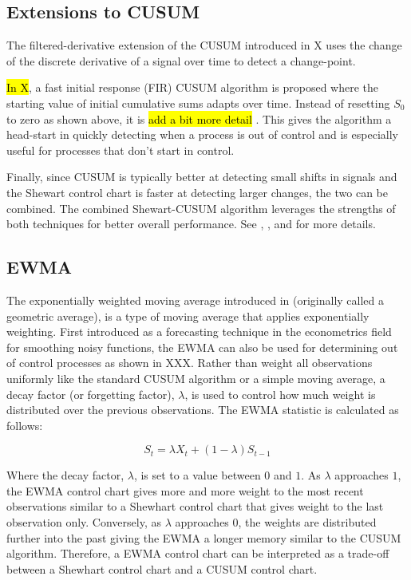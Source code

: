 \subsection{Extensions to CUSUM}
The filtered-derivative extension of the CUSUM introduced in X uses the change of the discrete derivative of a signal over time to detect a change-point. 

\hl{In X}, a fast initial response (FIR) CUSUM algorithm is proposed where the starting value of initial cumulative sums adapts over time. Instead of resetting $S_0$ to zero as shown above, it is \hl{add a bit more detail} . This gives the algorithm a head-start in quickly detecting when a process is out of control and is especially useful for processes that don't start in control.

Finally, since CUSUM is typically better at detecting small shifts in signals and the Shewart control chart is faster at detecting larger changes, the two can be combined. The combined Shewart-CUSUM algorithm leverages the strengths of both techniques for better overall performance. See \cite{lucas1982combined}, \cite{yashchin1985analysis}, and \cite{westgard1977combined} for more details. 

\subsection{EWMA}
The exponentially weighted moving average introduced in \cite{roberts1959control} (originally called a geometric average), is a type of moving average that applies exponentially weighting. First introduced as a forecasting technique in the econometrics field for smoothing noisy functions, the EWMA can also be used for determining out of control processes as shown in XXX. Rather than weight all observations uniformly like the standard CUSUM algorithm or a simple moving average, a decay factor (or forgetting factor), $\lambda$, is used to control how much weight is distributed over the previous observations. The EWMA statistic is calculated as follows:

$$S_t = \lambda X_t + (1-\lambda)S_{t-1} $$

Where the decay factor,  $\lambda$, is set to a value between $0$ and $1$. As $\lambda$ approaches $1$, the EWMA control chart gives more and more weight to the most recent observations similar to a Shewhart control chart that gives weight to the last observation only. Conversely, as $\lambda$ approaches $0$, the weights are distributed further into the past giving the EWMA a longer memory similar to the CUSUM algorithm. Therefore, a EWMA control chart can be interpreted as a trade-off between a Shewhart control chart and a CUSUM control chart. 


